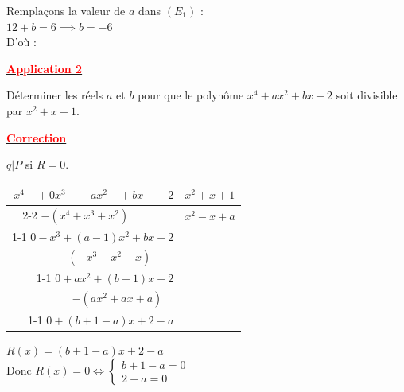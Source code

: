 \documentclass[12pt,a4paper]{article}
\begin{document}
\noindent Remplaçons la valeur de $a$ dans $(E_1)$ : \\
$12 + b = 6 \implies b = -6$ \\
D'où : 

\vspace{2em}

\begin{center}
    \textbf{\underline{\textcolor{red}{Application 2 }}}
\end{center}

\noindent Déterminer les réels $a$ et $b$ pour que le polynôme $x^4 + ax^2 + bx + 2$ soit divisible par $x^2 + x + 1$.

\begin{center}
    \textbf{\underline{\textcolor{red}{Correction}}}
\end{center}

\noindent $q | P$ si $R = 0$.

\begin{center}
\begin{tabular}{r|l}
    $x^4 \quad + 0x^3 \quad + ax^2 \quad + bx \quad + 2$ & $x^2 + x + 1$ \\
    \cline{2-2}
    $- (x^4 + x^3 + x^2) \quad \quad \quad \quad$ & $x^2 - x + a$ \\
    \cline{1-1}
    $0 - x^3 + (a-1)x^2 + bx + 2$ & \\
    $- (-x^3 - x^2 - x) \quad \quad$ & \\
    \cline{1-1}
    $0 + ax^2 + (b+1)x + 2$ & \\
    $- (ax^2 + ax + a) \quad$ & \\
    \cline{1-1}
    $0 + (b+1-a)x + 2-a$ & 
\end{tabular}
\end{center}

\noindent $R(x) = (b+1-a)x + 2-a$ \\
Donc $R(x) = 0 \iff \begin{cases} b + 1 - a = 0 \\ 2 - a = 0 \end{cases}$ \\
\end{document}
